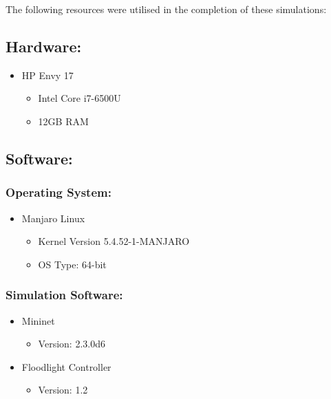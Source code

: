 The following resources were utilised in the completion of these simulations:

\subsection{Hardware:}

\begin{itemize}
	\item HP Envy 17
	\begin{itemize}
		\item Intel Core i7-6500U
		\item 12GB RAM
	\end{itemize}
\end{itemize}

\subsection{Software:}

\subsubsection{Operating System:}

\begin{itemize}
	\item Manjaro Linux
	\begin{itemize}
		\item Kernel Version 5.4.52-1-MANJARO
		\item OS Type: 64-bit
	\end{itemize}
\end{itemize}

\subsubsection{Simulation Software:}

\begin{itemize}
	\item Mininet
	\begin{itemize}
		\item Version: 2.3.0d6
	\end{itemize}
	\item Floodlight Controller
	\begin{itemize}
		\item Version: 1.2
	\end{itemize}
\end{itemize}
